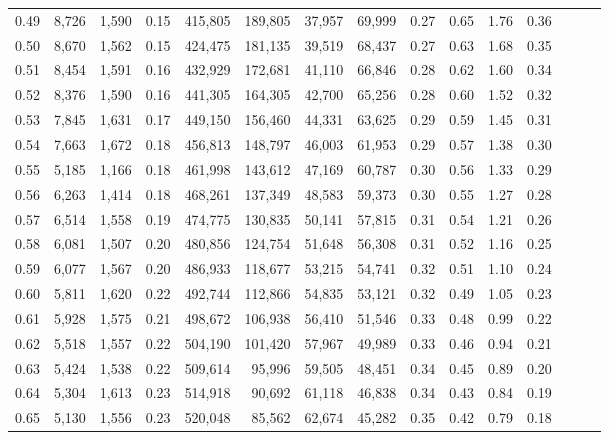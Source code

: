 \begin{tabular}{rrrrrrrrrrrrrrr}
0.49 &   8,726 &  1,590 &  0.15 &  415,805 &  189,805 &   37,957 &   69,999 &  0.27 &  0.65 &  1.76 &      0.36 \\
0.50 &   8,670 &  1,562 &  0.15 &  424,475 &  181,135 &   39,519 &   68,437 &  0.27 &  0.63 &  1.68 &      0.35 \\
0.51 &   8,454 &  1,591 &  0.16 &  432,929 &  172,681 &   41,110 &   66,846 &  0.28 &  0.62 &  1.60 &      0.34 \\
0.52 &   8,376 &  1,590 &  0.16 &  441,305 &  164,305 &   42,700 &   65,256 &  0.28 &  0.60 &  1.52 &      0.32 \\
0.53 &   7,845 &  1,631 &  0.17 &  449,150 &  156,460 &   44,331 &   63,625 &  0.29 &  0.59 &  1.45 &      0.31 \\
0.54 &   7,663 &  1,672 &  0.18 &  456,813 &  148,797 &   46,003 &   61,953 &  0.29 &  0.57 &  1.38 &      0.30 \\
0.55 &   5,185 &  1,166 &  0.18 &  461,998 &  143,612 &   47,169 &   60,787 &  0.30 &  0.56 &  1.33 &      0.29 \\
0.56 &   6,263 &  1,414 &  0.18 &  468,261 &  137,349 &   48,583 &   59,373 &  0.30 &  0.55 &  1.27 &      0.28 \\
0.57 &   6,514 &  1,558 &  0.19 &  474,775 &  130,835 &   50,141 &   57,815 &  0.31 &  0.54 &  1.21 &      0.26 \\
0.58 &   6,081 &  1,507 &  0.20 &  480,856 &  124,754 &   51,648 &   56,308 &  0.31 &  0.52 &  1.16 &      0.25 \\
0.59 &   6,077 &  1,567 &  0.20 &  486,933 &  118,677 &   53,215 &   54,741 &  0.32 &  0.51 &  1.10 &      0.24 \\
0.60 &   5,811 &  1,620 &  0.22 &  492,744 &  112,866 &   54,835 &   53,121 &  0.32 &  0.49 &  1.05 &      0.23 \\
0.61 &   5,928 &  1,575 &  0.21 &  498,672 &  106,938 &   56,410 &   51,546 &  0.33 &  0.48 &  0.99 &      0.22 \\
0.62 &   5,518 &  1,557 &  0.22 &  504,190 &  101,420 &   57,967 &   49,989 &  0.33 &  0.46 &  0.94 &      0.21 \\
0.63 &   5,424 &  1,538 &  0.22 &  509,614 &   95,996 &   59,505 &   48,451 &  0.34 &  0.45 &  0.89 &      0.20 \\
0.64 &   5,304 &  1,613 &  0.23 &  514,918 &   90,692 &   61,118 &   46,838 &  0.34 &  0.43 &  0.84 &      0.19 \\
0.65 &   5,130 &  1,556 &  0.23 &  520,048 &   85,562 &   62,674 &   45,282 &  0.35 &  0.42 &  0.79 &      0.18 \\

\end{tabular}
